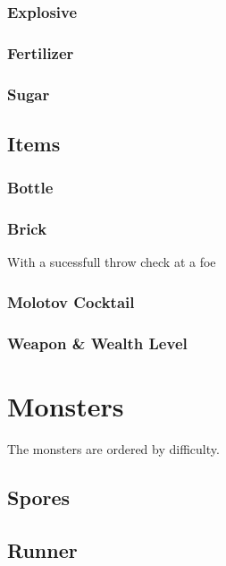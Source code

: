 \documentclass[10pt,twoside,twocolumn]{book}
\begin{document}
\subsection{Explosive}

\subsection{Fertilizer}

\subsection{Sugar}

\section{Items}

\subsection{Bottle}

\subsection{Brick}

With a sucessfull throw check at a foe

\subsection{Molotov Cocktail}

\subsection{Weapon \& Wealth Level}

%
%
\mainmatter
\chapter{Monsters}

The monsters are ordered by difficulty.

\section{Spores}

\section{Runner}
\end{document}
